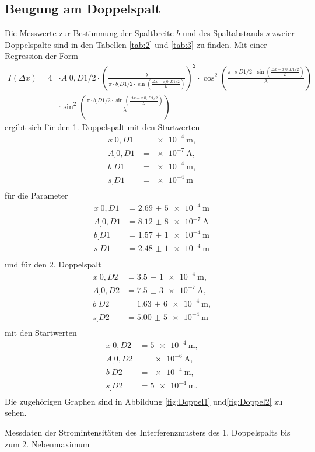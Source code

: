 \subsection{Beugung am Doppelspalt}
Die Messwerte zur Bestimmung der Spaltbreite $b$ und des Spaltabstands $s$ zweier Doppelspalte sind in den Tabellen \ref{tab:2} und \ref{tab:3} zu finden.
Mit einer Regression der Form 
\[
\begin{split}
I(\Delta x)=4&\cdot A_.{0,D1/2}\cdot \left(
\frac{\lambda}{\pi\cdot b_.{D1/2}\cdot\sin{\left(\frac{\Delta x-x_.{0,D1/2}}{L}\right)}}\right)^2\cdot\cos^2{\left(\frac{\pi\cdot s_.{D1/2}\cdot \sin{\left(\frac{\Delta x-x_.{0,D1/2}}{L}\right)}}{\lambda}\right)}\\
&\cdot\sin^2{\left(\frac{\pi\cdot b_.{D1/2}\cdot\sin{\left(\frac{\Delta x-x_.{0,D1/2}}{L}\right)}}{\lambda}\right)}
\end{split}
\]
ergibt sich für den 1. Doppelspalt mit den Startwerten
\begin{align*}
x_.{0,D1} 	&=\SI{e-4}{\metre}\text{,}\\
A_.{0,D1} 	&=\SI{e-7}{\ampere}\text{,}\\
b_.{D1} 	&=\SI{e-4}{\metre}\text{,}\\
s_.{D1} 	&=\SI{e-4}{\metre}\\
\end{align*}
für die Parameter
\begin{align*}
x_.{0,D1} &= \SI{2,69(5)e-4}{\metre}\\
A_.{0,D1} &= \SI{8,12(8)e-7}{\ampere}\\
b_.{D1}	  &= \SI{1,57(1)e-4}{\metre}\\
s_.{D1}	  &= \SI{2,48(1)e-4}{\metre}\\
\end{align*}
und für den 2. Doppelspalt 
\begin{align*}
x_.{0,D2} &= \SI{3,5(1)e-4}{\metre}\text{,}\\
A_.{0,D2} &= \SI{7,5(3)e-7}{\ampere}\text{,}\\
b_.{D2}	  &= \SI{1,63(6)e-4}{\metre}\text{,}\\
s_.{D2}	  &= \SI{5,00(5)e-4}{\metre}\\
\end{align*}
mit den Startwerten
\begin{align*}
x_.{0,D2} 	&=\SI{5e-4}{\metre}\text{,}\\
A_.{0,D2} 	&=\SI{e-6}{\ampere}\text{,}\\
b_.{D2} 	&=\SI{e-4}{\metre}\text{,}\\
s_.{D2} 	&=\SI{5e-4}{\metre}\text{.}\\
\end{align*}
Die zugehörigen Graphen sind in Abbildung \ref{fig:Doppel1} und\ref{fig:Doppel2} zu sehen.
\begin{table}
	\centering
	\caption{Messdaten der Stromintensitäten des Interferenzmusters des 1. Doppelspalts bis zum 2. Nebenmaximum}
	
	
	\label{tab:2}
\end{table}

